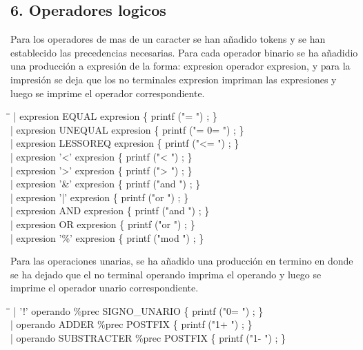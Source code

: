 \documentclass[11pt,spanish]{article}
\begin{document}
        \subsection*{6. Operadores logicos}
        Para los operadores de mas de un caracter se han añadido tokens y se han establecido las precedencias necesarias. Para cada operador binario se ha añadidio una producción a expresión de la forma: expresion operador expresion, y para la impresión se deja que los no terminales expresion impriman las expresiones y luego se imprime el operador correspondiente.
        \begin{tabbing}
            \hspace*{1cm}\=\hspace*{1cm}\= \hspace*{6cm}\=\kill
            \>| expresion  EQUAL expresion\> \>	    \{ printf  ("= ") ; \}\\
            \>| expresion  UNEQUAL expresion\> \>	    \{ printf  ("= 0= ") ; \}\\
            \>| expresion  LESSOREQ expresion\> \>	\{ printf  ("<= ") ; \}\\
            \>| expresion  '<' expresion\> \>		    \{ printf  ("< ") ; \}\\
            \>| expresion  '>' expresion\> \>	        \{ printf  ("> ") ; \}\\
            \>| expresion  '\&' expresion\> \>		    \{ printf  ("and ") ; \}\\
            \>| expresion  '|' expresion\> \>		    \{ printf  ("or ") ; \}\\
            \>| expresion  AND expresion\> \>	        \{ printf  ("and ") ; \}\\
            \>| expresion  OR expresion\> \>	        \{ printf  ("or ") ; \}\\
            \>| expresion  '\%' expresion\> \>		    \{ printf  ("mod ") ; \}
        \end{tabbing}
        Para las operaciones unarias, se ha añadido una producción en termino en donde se ha dejado que el no terminal operando imprima el operando y luego se imprime el operador unario correspondiente.
        \begin{tabbing}
            \hspace*{1cm}\=\hspace*{1cm}\= \hspace*{8cm}\=\kill
            \>| '!' operando \%prec SIGNO\_UNARIO\> \>  \{ printf ("0= ") ; \}\\
            \>| operando ADDER \%prec POSTFIX\> \>  \{ printf ("1+ ") ; \}\\
            \>| operando SUBSTRACTER \%prec POSTFIX\> \> \{ printf ("1- ") ; \}
        \end{tabbing}
\end{document}
